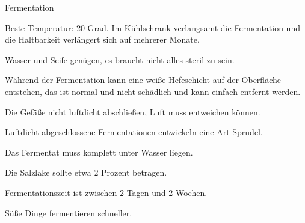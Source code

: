 Fermentation
\begin{compactitem}
\item Beste Temperatur: 20 Grad. Im Kühlschrank verlangsamt die Fermentation und die Haltbarkeit verlängert sich auf mehrerer Monate.
\item Wasser und Seife genügen, es braucht nicht alles steril zu sein.
\item Während der Fermentation kann eine weiße Hefeschicht auf der Oberfläche entstehen, das ist normal und nicht schädlich und kann einfach entfernt werden.
\item Die Gefäße nicht luftdicht abschließen, Luft muss entweichen können.
\item Luftdicht abgeschlossene Fermentationen entwickeln eine Art Sprudel.
\item Das Fermentat muss komplett unter Wasser liegen.
\item Die Salzlake sollte etwa 2 Prozent betragen.
\item Fermentationszeit ist zwischen 2 Tagen und 2 Wochen.
\item Süße Dinge fermentieren schneller.
\end{compactitem}

